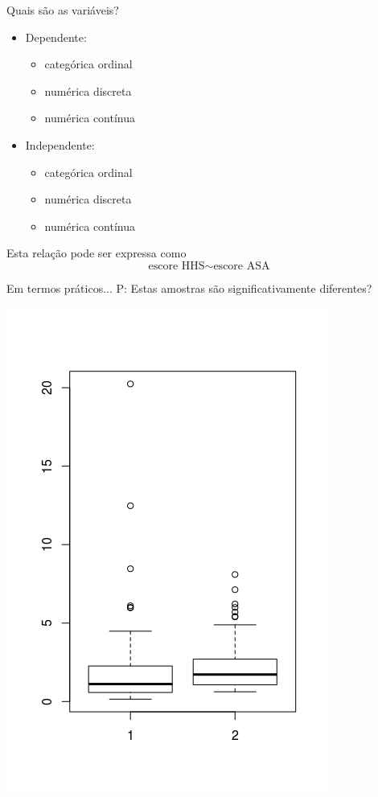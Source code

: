 \documentclass{beamer}
\begin{document}
\begin{frame}{Quais são as variáveis?}
  \begin{itemize}
    \small
  \item Dependente:
    \begin{itemize}
      \footnotesize
    \item categórica ordinal
    \item numérica discreta
    \item numérica contínua
    \end{itemize}
  \item Independente:
    \begin{itemize}
      \footnotesize
    \item categórica ordinal
    \item numérica discreta
    \item numérica contínua
    \end{itemize}
  \end{itemize}
  \vfill
  \begin{block}{Esta relação pode ser expressa como}
    \begin{displaymath}
      \text{escore HHS} \sim \text{escore ASA}
    \end{displaymath}
  \end{block}
\end{frame}

\begin{frame}{Em termos práticos...}
P: Estas amostras são significativamente diferentes?

  \centering
  \includegraphics[height=\textheight]{Cap37-38/2samples-bp}
\end{frame}
\end{document}
